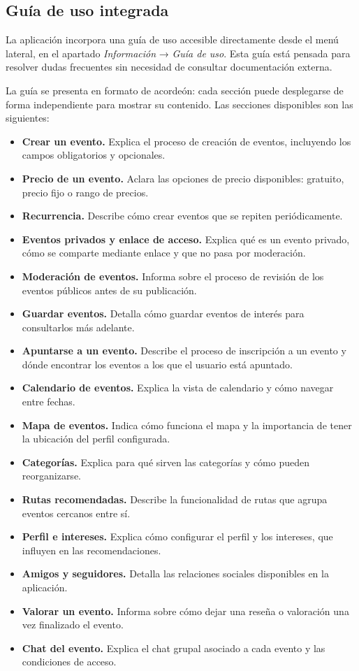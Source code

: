 \clearpage

\subsection{Guía de uso integrada}

La aplicación incorpora una guía de uso accesible directamente desde el menú lateral, en el apartado \textit{Información} → \textit{Guía de uso}. Esta guía está pensada para resolver dudas frecuentes sin necesidad de consultar documentación externa.

La guía se presenta en formato de acordeón: cada sección puede desplegarse de forma independiente para mostrar su contenido. Las secciones disponibles son las siguientes:

\begin{itemize}[leftmargin=1.5em]
    \item \textbf{Crear un evento.} Explica el proceso de creación de eventos, incluyendo los campos obligatorios y opcionales.
    \item \textbf{Precio de un evento.} Aclara las opciones de precio disponibles: gratuito, precio fijo o rango de precios.
    \item \textbf{Recurrencia.} Describe cómo crear eventos que se repiten periódicamente.
    \item \textbf{Eventos privados y enlace de acceso.} Explica qué es un evento privado, cómo se comparte mediante enlace y que no pasa por moderación.
    \item \textbf{Moderación de eventos.} Informa sobre el proceso de revisión de los eventos públicos antes de su publicación.
    \item \textbf{Guardar eventos.} Detalla cómo guardar eventos de interés para consultarlos más adelante.
    \item \textbf{Apuntarse a un evento.} Describe el proceso de inscripción a un evento y dónde encontrar los eventos a los que el usuario está apuntado.
    \item \textbf{Calendario de eventos.} Explica la vista de calendario y cómo navegar entre fechas.
    \item \textbf{Mapa de eventos.} Indica cómo funciona el mapa y la importancia de tener la ubicación del perfil configurada.
    \item \textbf{Categorías.} Explica para qué sirven las categorías y cómo pueden reorganizarse.
    \item \textbf{Rutas recomendadas.} Describe la funcionalidad de rutas que agrupa eventos cercanos entre sí.
    \item \textbf{Perfil e intereses.} Explica cómo configurar el perfil y los intereses, que influyen en las recomendaciones.
    \item \textbf{Amigos y seguidores.} Detalla las relaciones sociales disponibles en la aplicación.
    \item \textbf{Valorar un evento.} Informa sobre cómo dejar una reseña o valoración una vez finalizado el evento.
    \item \textbf{Chat del evento.} Explica el chat grupal asociado a cada evento y las condiciones de acceso.
\end{itemize}


